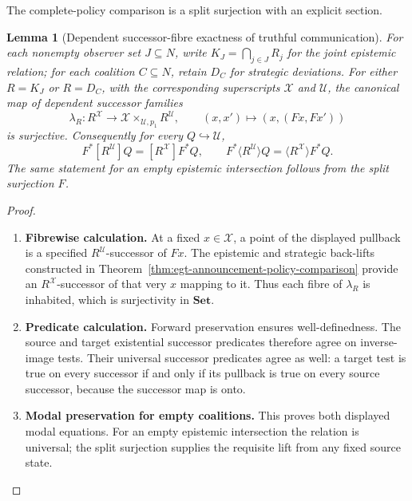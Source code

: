 \documentclass[11pt,a4paper]{article}
\numberwithin{equation}{section}
\newtheorem{lemma}[theorem]{Lemma}
\theoremstyle{definition}
\theoremstyle{remark}
\theoremstyle{plain}
\providecommand{\id}{\mathop{\mathrm{id}}}
\begin{document}
\noindent The complete-policy comparison is a split surjection with an explicit section.
\begin{center}
\end{center}

\begin{lemma}[Dependent successor-fibre exactness of truthful communication]
\label{lem:egt-announcement-successor-fibres}
For each nonempty observer set $J\subseteq N$, write
$K_J=\bigcap_{j\in J}R_j$ for the joint epistemic relation; for each
coalition $C\subseteq N$, retain $D_C$ for strategic deviations.
For either $R=K_J$ or $R=D_C$, with the corresponding superscripts
$\mathcal X$ and $\mathcal U$, the canonical map of dependent
successor families
\[
 \lambda_R:R^{\mathcal X}\longrightarrow
 \mathcal X\times_{\mathcal U,p_1}R^{\mathcal U},
 \qquad (x,x')\longmapsto(x,(Fx,Fx'))
\]
is surjective. Consequently for every $Q\hookrightarrow\mathcal U$,
\[
 F^*[R^{\mathcal U}]Q=[R^{\mathcal X}]F^*Q,
 \qquad
 F^*\langle R^{\mathcal U}\rangle Q
   =\langle R^{\mathcal X}\rangle F^*Q.
\]
The same statement for an empty epistemic intersection follows from
the split surjection $F$.
\end{lemma}
\begin{proof}
\leavevmode
\begin{enumerate}[label=\textup{(\arabic*)},leftmargin=*,itemsep=4pt,topsep=3pt]
  \item \textbf{Fibrewise calculation.} At a fixed $x\in\mathcal X$, a point of the displayed pullback is a
specified $R^{\mathcal U}$-successor of $Fx$. The epistemic and strategic
back-lifts constructed in
Theorem~\ref{thm:egt-announcement-policy-comparison} provide an
$R^{\mathcal X}$-successor of that very $x$ mapping to it. Thus each
fibre of $\lambda_R$ is inhabited, which is surjectivity in
$\mathbf{Set}$.
  \item \textbf{Predicate calculation.} Forward preservation ensures well-definedness. The source and target existential successor predicates therefore agree on
inverse-image tests. Their universal successor predicates agree as well:
a target test is true on every successor if and only if its pullback is
true on every source successor, because the successor map is onto.
  \item \textbf{Modal preservation for empty coalitions.} This proves both displayed modal equations. For an empty epistemic
intersection the relation is universal; the split surjection supplies
the requisite lift from any fixed source state.
\end{enumerate}
\end{proof}
\end{document}
